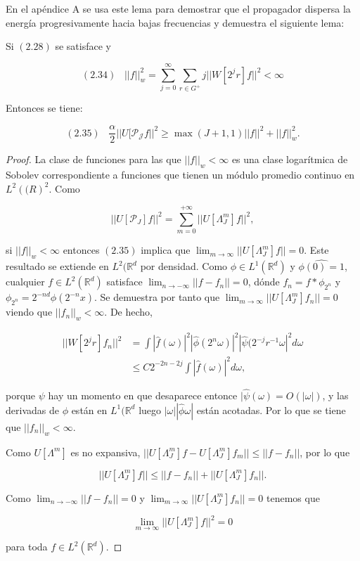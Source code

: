 \noindent En el apéndice A se usa este lema para demostrar que el propagador dispersa la energía progresivamente hacia bajas frecuencias y demuestra el siguiente lema: 

\begin{lema} \label{lemaDeAdmisibilidad}
Si $(2.28)$ se satisface y 

$$(2.34) \;\;\; ||f||_w^2=\sum_{j=0}^\infty \sum_{r\in G^+} j ||W[2^j r] f||^2 < \infty$$

\noindent Entonces se tiene: 

$$(2.35) \;\;\; \frac{\alpha}{2}||U[\mathcal{P_J}f||^2 \geq \max (J+1,1) ||f||^2 + ||f||_w^2.$$
\end{lema}

\begin{proof}
\noindent La clase de funciones para las que $||f||_w < \infty$ es una clase logarítmica de Sobolev correspondiente a funciones que tienen un módulo promedio continuo en $L^2(\mathbb(R)^2$. Como 

$$ || U[\mathcal{P}_J]f ||^2= \sum_{m=0}^{+\infty} ||U[\Lambda_J^m]f||^2,$$

\noindent si $||f||_w < \infty$ entonces $(2.35)$ implica que $\lim_{m\rightarrow\infty}||U[\Lambda_J^m]f||= 0$. Este resultado se extiende en $L^2(\mathbb{R}^d$ por densidad. Como $\phi \in L^1(\mathbb{R}^d)$ y $\widehat{\phi(0)=1}$, cualquier $f\in L^2(\mathbb{R}^d)$ satisface $\lim_{n\rightarrow - \infty} ||f-f_n||=0$, dónde $f_n=f \ast \phi_{2^n}$ y $\phi_{2^n}=2^{-nd} \phi(2^{-n}x)$. Se demuestra por tanto que $\lim_{m\rightarrow \infty} ||U[\Lambda_J^m]f_n||=0$ viendo que $||f_n||_w < \infty$. De hecho, 


\begin{align*}
    ||W[2^jr]f_n||^2 &= \int |\widehat{f}(\omega)|^2 |\widehat{\phi}(2^n \omega)|^2 |\widehat{\psi}(2^{-j}r^{-1}\omega|^2 d\omega \\
    &\leq C 2^{-2n-2j} \int |\widehat{f}(\omega)|^2 d\omega,
\end{align*}

\noindent porque $\psi$ hay un momento en que desaparece entonce $|\widehat{\psi}(\omega)=O(|\omega|)$, y las derivadas de $\phi$ están en $L^1(\mathbb{R}^d$ luego $|\omega||\widehat{\phi}\omega|$ están acotadas. Por lo que se tiene que $||f_n||_w < \infty$.

\medskip

\noindent Como $U[\Lambda^m]$ es no expansiva, $||U[\Lambda_J^m]f-U[\Lambda_J^m]f_m|| \leq ||f - f_n||$, por lo que 

$$||U[\Lambda_J^m]f|| \leq || f-f_n|| + ||U[\Lambda_J^m]f_n||.$$

\noindent Como $\lim_{n\rightarrow -\infty}||f-f_n||=0$ y $\lim_{m\rightarrow\infty}||U[\Lambda_J^m]f_n||=0$ tenemos que 

$$\lim_{m\rightarrow\infty} ||U[\Lambda_J^m]f||^2=0$$

\noindent para toda $f \in L^2(\mathbb{R}^d)$. \qedhere
\end{proof}



